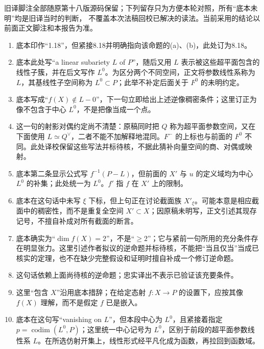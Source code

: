 \documentclass[UTF8,a4paper]{ctexbook}
\begin{document}
旧译脚注全部随原第十八版源码保留；下列留存只为方便本轮对照，所有“底本未明”均是旧译当时的判断，
不覆盖本次法稿回校已解决的读法。当前采用的结论以前面正文脚注和本报告为准。
\begin{enumerate}
\item 底本印作“1.18”，但紧接8.18并明确指向该命题的(a)、(b)，此处订为8.18。

\item 底本此处写“a linear subariety $L$ of $P$”，随后又用 $L$ 表示被这些超平面包含的线性子簇，并在后文写作 $L^0$。为区分两个不同空间，正文将参数线性系称为 $L$，其基线性子空间称为 $L^0\subset P$；此举不补定后面关于 $F^0$ 的未明约定。

\item 底本写成“$f(X)\notin L-0$”，下一句立即给出上述逆像稠密条件；这里订正为像不包含于中心 $L^0$，不是把像当成一个点。

\item 这一句的射影对偶约定尚不清楚：原稿同时把 $Q$ 称为超平面参数空间，又在下面使用 $L\simeq Q^\vee$，二者不能不加解释地混同。$F^-$ 的上标也与前面的 $F^0$ 不同。此处译校保留这些写法并标待核，不据此猜补向量空间的商、对偶或映射。

\item 底本第二条显示公式写 $f^{-1}(P-L)$，但前面的 $X'$ 与 $u$ 的定义域均为中心 $L^0$ 的补集；此处统一为 $L^0$。$f'$ 指 $f$ 在 $X'$ 上的限制。

\item 底本在这句话中未写 $\xi$ 下标，但上句正在讨论截面族 $X'_\xi$。可能本意是相应截面中的稠密性，而不是重复全空间 $X'\subset X$；因原稿未明写，正文引述其现存记号，不擅自补成对所有截面的断言。

\item 底本确实为“$\dim f(X)=2$”，不是“$\ge2$”；它与紧前一句所用的充分条件存在明显张力。这里引述作者拟议的逆命题并标待核，不能把“当且仅当”当成已核实的定理，也不在缺少完整假设和证明时擅自补成一个修订逆命题。

\item 这句话依赖上面尚待核的逆命题；忠实译出不表示已验证该充要条件。

\item 这里“包含 $X$”沿用底本措辞；在给定态射 $f:X\to P$ 的设置下，应按其像 $f(X)$ 理解，而不是假定 $f$ 已是嵌入。

\item 底本在这句写“vanishing on $L$”，但本段中心为 $L^0$，且紧接着指定 $p=\operatorname{codim}(L^0,P)$；这里统一中心记号为 $L^0$，区别于前段的超平面参数线性系 $L$。在所选仿射开集上，线性形式经平凡化成为函数，再拉回到函数域。


\end{enumerate}
\end{document}
